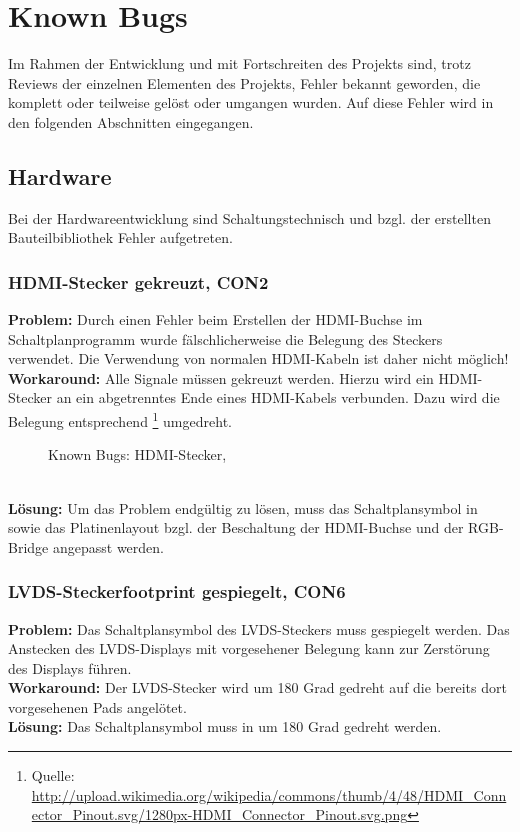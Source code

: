 \section{Known Bugs}
Im Rahmen der Entwicklung und mit Fortschreiten des Projekts sind, trotz Reviews der einzelnen Elementen des Projekts, Fehler bekannt geworden, die komplett oder teilweise gelöst oder umgangen wurden. Auf diese Fehler wird in den folgenden Abschnitten eingegangen.
\subsection{Hardware}
Bei der Hardwareentwicklung sind Schaltungstechnisch und bzgl. der erstellten Bauteilbibliothek Fehler aufgetreten. 
\subsubsection{HDMI-Stecker gekreuzt, CON2}
\textbf{Problem:} Durch einen Fehler beim Erstellen der HDMI-Buchse im Schaltplanprogramm  wurde fälschlicherweise die Belegung des Steckers verwendet. Die Verwendung von normalen HDMI-Kabeln ist daher nicht möglich!\\
\textbf{Workaround:} Alle Signale müssen gekreuzt werden. Hierzu wird ein HDMI-Stecker an ein abgetrenntes Ende eines HDMI-Kabels verbunden. Dazu wird die Belegung entsprechend \footnote{Quelle: \url{http://upload.wikimedia.org/wikipedia/commons/thumb/4/48/HDMI_Connector_Pinout.svg/1280px-HDMI_Connector_Pinout.svg.png}} umgedreht.
\begin{figure}[htp]
	\center
    \caption{Known Bugs: HDMI-Stecker, }
    \label{fig:hdmi_stecker_problem}
\end{figure}\\
\textbf{Lösung:} Um das Problem endgültig zu lösen, muss das Schaltplansymbol in  sowie das Platinenlayout bzgl. der Beschaltung der HDMI-Buchse und der RGB-Bridge angepasst werden.
\subsubsection{LVDS-Steckerfootprint gespiegelt, CON6}
\textbf{Problem:} Das Schaltplansymbol des LVDS-Steckers muss gespiegelt werden. Das Anstecken des LVDS-Displays mit vorgesehener Belegung kann zur Zerstörung des Displays führen.\\
\textbf{Workaround:} Der LVDS-Stecker wird um 180 Grad gedreht auf die bereits dort vorgesehenen Pads angelötet.\\
\textbf{Lösung:} Das Schaltplansymbol muss in  um 180 Grad gedreht werden.
